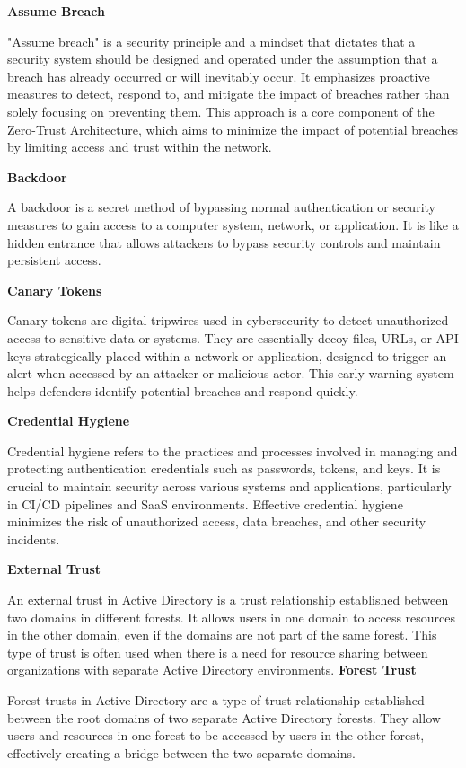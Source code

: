 \textbf{Assume Breach}

"Assume breach" is a security principle and a mindset that dictates that a security system should be designed and operated under the assumption that a breach has already occurred or will inevitably occur. It emphasizes proactive measures to detect, respond to, and mitigate the impact of breaches rather than solely focusing on preventing them. This approach is a core component of the Zero-Trust Architecture, which aims to minimize the impact of potential breaches by limiting access and trust within the network.

\textbf{Backdoor}

A backdoor is a secret method of bypassing normal authentication or security measures to gain access to a computer system, network, or application. It is like a hidden entrance that allows attackers to bypass security controls and maintain persistent access.

\textbf{Canary Tokens}

Canary tokens are digital tripwires used in cybersecurity to detect unauthorized access to sensitive data or systems. They are essentially decoy files, URLs, or API keys strategically placed within a network or application, designed to trigger an alert when accessed by an attacker or malicious actor. This early warning system helps defenders identify potential breaches and respond quickly.

\textbf{Credential Hygiene}

Credential hygiene refers to the practices and processes involved in managing and protecting authentication credentials such as passwords, tokens, and keys. It is crucial to maintain security across various systems and applications, particularly in CI/CD pipelines and SaaS environments. Effective credential hygiene minimizes the risk of unauthorized access, data breaches, and other security incidents.

\textbf{External Trust}

An external trust in Active Directory is a trust relationship established between two domains in different forests. It allows users in one domain to access resources in the other domain, even if the domains are not part of the same forest. This type of trust is often used when there is a need for resource sharing between organizations with separate Active Directory environments.
\textbf{Forest Trust}

Forest trusts in Active Directory are a type of trust relationship established between the root domains of two separate Active Directory forests. They allow users and resources in one forest to be accessed by users in the other forest, effectively creating a bridge between the two separate domains.
